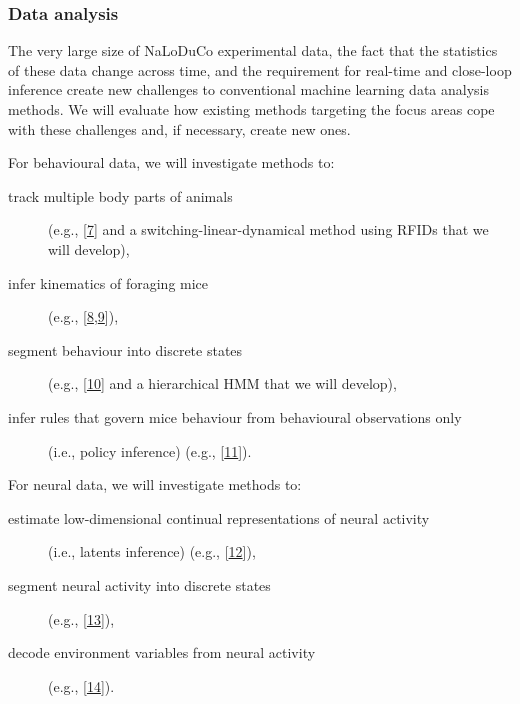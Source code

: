 \subsubsection{Data analysis}

The very large size of NaLoDuCo experimental data, the fact that the statistics
of these data change across time, and the requirement for real-time and
close-loop inference create new challenges to conventional machine learning
data analysis methods.
%
We will evaluate how existing methods targeting the focus areas cope with these
challenges and, if necessary, create new ones.

For behavioural data, we will investigate methods to:

\begin{description}

    \item[track multiple body parts of animals] (e.g.,
        [\href{https://pubmed.ncbi.nlm.nih.gov/30127430/}{7}] and a
        switching-linear-dynamical method using RFIDs that we will develop),

    \item[infer kinematics of foraging mice] (e.g.,
        [\href{https://github.com/joacorapela/lds\_python}{8},\href{https://www.cambridge.org/core/books/fundamentals-of-object-tracking/A543B0EA12957B353BE4B5D0602EE945}{9}]),

    \item[segment behaviour into discrete states] (e.g.,
        [\href{https://pubmed.ncbi.nlm.nih.gov/26687221/}{10}]
        and a hierarchical HMM that we will develop),

    \item[infer rules that govern mice behaviour from behavioural
        observations only] (i.e., policy inference) (e.g.,
        [\href{https://arxiv.org/abs/2311.13870v2}{11}]).

\end{description}

For neural data, we will investigate methods to:

\begin{description}

    \item[estimate low-dimensional continual representations of neural
        activity]
        (i.e., latents inference) (e.g.,
        [\href{https://papers.nips.cc/paper_files/paper/2011/hash/7143d7fbadfa4693b9eec507d9d37443-Abstract.html}{12}]),

    \item[segment neural activity into discrete states] (e.g.,
        [\href{https://pubmed.ncbi.nlm.nih.gov/21299424/}{13}]),

    \item[decode environment variables from neural activity] (e.g.,
        [\href{https://pubmed.ncbi.nlm.nih.gov/25973549/}{14}]).

\end{description}
